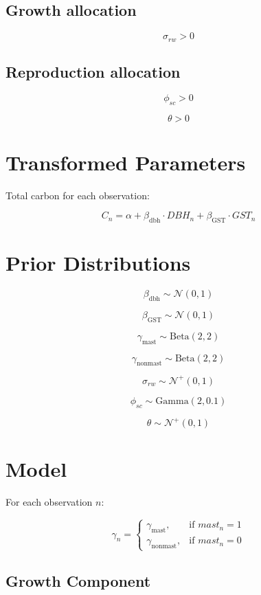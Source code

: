 \documentclass[11pt]{article}
\begin{document}
\subsection*{Growth allocation}

\[
\sigma_{rw} > 0
\]

\subsection*{Reproduction allocation}

\[
\phi_{sc} > 0
\]

\[
\theta > 0
\]

\section*{Transformed Parameters}

Total carbon for each observation:

\[
C_n = \alpha + \beta_{\text{dbh}} \cdot DBH_n + \beta_{\text{GST}} \cdot GST_n
\]

\section*{Prior Distributions}

\[
\beta_{\text{dbh}} \sim \mathcal{N}(0,1)
\]

\[
\beta_{\text{GST}} \sim \mathcal{N}(0,1)
\]

\[
\gamma_{\text{mast}} \sim \text{Beta}(2,2)
\]

\[
\gamma_{\text{nonmast}} \sim \text{Beta}(2,2)
\]

\[
\sigma_{rw} \sim \mathcal{N}^{+}(0,1)
\]

\[
\phi_{sc} \sim \text{Gamma}(2,0.1)
\]

\[
\theta \sim \mathcal{N}^{+}(0,1)
\]

\section*{Model}

For each observation $n$:

\[
\gamma_n =
\begin{cases}
\gamma_{\text{mast}}, & \text{if } mast_n = 1 \\
\gamma_{\text{nonmast}}, & \text{if } mast_n = 0
\end{cases}
\]

\subsection*{Growth Component}
\end{document}
